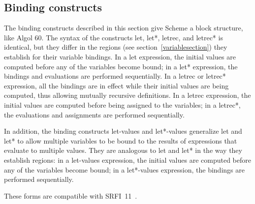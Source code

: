 \subsection{Binding constructs}

The binding constructs described in this section
give Scheme a block structure, like Algol 60.  The syntax of the 
constructs
{\cf let}, {\cf let*}, {\cf letrec}, and {\cf letrec*}
 is identical, but they differ in the regions
(see section~\ref{variablesection}) they establish
for their variable bindings.  In a {\cf let} expression, the initial
values are computed before any of the variables become bound; in a
{\cf let*} expression, the bindings and evaluations are performed
sequentially.  In a {\cf letrec} or {\cf letrec*}
expression, all the bindings are in
effect while their initial values are being computed, thus allowing
mutually recursive definitions.  In a {\cf letrec} expression, the
initial values are computed before being assigned to the variables;
in a {\cf letrec*}, the evaluations and assignments are performed
sequentially.

In addition, the binding constructs {\cf let-values} and {\cf
  let*-values} generalize {\cf let} and {\cf let*} to allow multiple
variables to be bound to the results of expressions that evaluate to
multiple values.
They are analogous to {\cf let} and {\cf let*} in the
way they establish regions: in a {\cf let-values} expression, the
initial values are computed before any of the variables become bound;
in a {\cf let*-values} expression, the bindings are performed
sequentially. 

\begin{note}
  These forms are compatible with SRFI~11~\cite{srfi11}.
\end{note}

